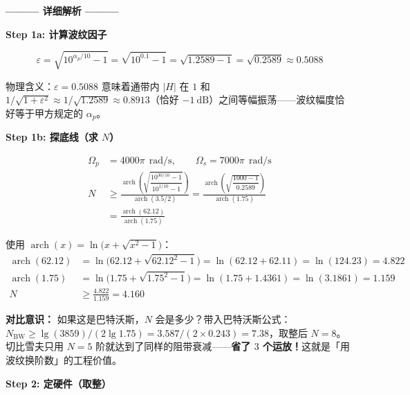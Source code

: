 \documentclass[12pt,a4paper]{ctexart}
\newcommand{\db}{\ \mathrm{dB}}
\newcommand{\rads}{\ \mathrm{rad/s}}
\newcommand{\arch}{\operatorname{arch}}
\begin{document}
\vspace{8pt}

\begin{center}
    \textbf{——— 详细解析 ———}
\end{center}

\textbf{\color{butterworth!90}Step 1a: 计算波纹因子}

\[
\varepsilon = \sqrt{10^{\alpha_p/10} - 1} = \sqrt{10^{0.1} - 1}
            = \sqrt{1.2589 - 1} = \sqrt{0.2589} \approx 0.5088
\]

物理含义：$\varepsilon = 0.5088$ 意味着通带内 $|H|$ 在 $1$ 和 $1/\sqrt{1+\varepsilon^2} \approx 1/\sqrt{1.2589} \approx 0.8913$（恰好 $-1\db$）之间等幅振荡——波纹幅度恰好等于甲方规定的 $\alpha_p$。

\vspace{4pt}

\textbf{\color{butterworth!90}Step 1b: 探底线（求 $N$）}

\begin{align*}
\Omega_p &= 4000\pi\ \rads,\qquad \Omega_s = 7000\pi\ \rads \\[4pt]
N &\ge \frac{\arch\!\left(\sqrt{\dfrac{10^{30/10}-1}{10^{1/10}-1}}\right)}
                {\arch(3.5/2)}
     = \frac{\arch\!\left(\sqrt{\dfrac{1000-1}{0.2589}}\right)}
                {\arch(1.75)} \\[4pt]
  &= \frac{\arch(62.12)}{\arch(1.75)}
\end{align*}

使用 $\arch(x) = \ln\bigl(x + \sqrt{x^2-1}\bigr)$：
\begin{align*}
\arch(62.12) &= \ln\!\bigl(62.12 + \sqrt{62.12^2-1}\bigr)
              = \ln(62.12 + 62.11) = \ln(124.23) = 4.822 \\[2pt]
\arch(1.75)  &= \ln\!\bigl(1.75 + \sqrt{1.75^2-1}\bigr)
              = \ln(1.75 + 1.4361) = \ln(3.1861) = 1.159 \\[4pt]
N &\ge \frac{4.822}{1.159} = 4.160
\end{align*}

\begin{insight}
\textbf{对比意识：} 如果这是巴特沃斯，$N$ 会是多少？带入巴特沃斯公式：
$N_{\text{BW}} \ge \lg(3859)/(2\lg1.75) = 3.587/(2\times0.243)=7.38$，取整后 $N=8$。
切比雪夫只用 $N=5$ 阶就达到了同样的阻带衰减——\textbf{省了 $3$ 个运放！}这就是「用波纹换阶数」的工程价值。
\end{insight}

\textbf{\color{deepgreen!90}Step 2: 定硬件（取整）}
\end{document}
